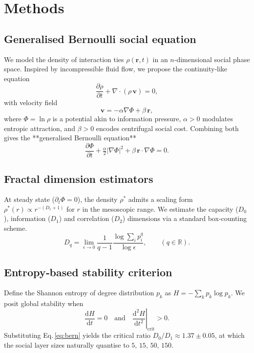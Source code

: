 \section{Methods}\label{sec:methods}

\subsection{Generalised Bernoulli social equation}\label{sec:bernoulli}
We model the density of interaction ties $\rho(\mathbf{r},t)$ in an $n$‑dimensional social phase space.  
Inspired by incompressible fluid flow, we propose the continuity‐like equation
\begin{equation}
\frac{\partial \rho}{\partial t} + \nabla\!\cdot\!(\rho\,\mathbf{v}) = 0 ,
\end{equation}
with velocity field
\begin{equation}
\mathbf{v} = -\alpha \nabla \Phi + \beta\,\mathbf{r},
\end{equation}
where $\Phi = \ln\rho$ is a potential akin to information pressure,  
$\alpha>0$ modulates entropic attraction, and $\beta>0$ encodes centrifugal social cost.  
Combining both gives the **generalised Bernoulli equation**
\begin{equation}
\frac{\partial \Phi}{\partial t} + \tfrac{\alpha}{2}\bigl|\nabla\Phi\bigr|^{2}
+ \beta\,\mathbf{r}\!\cdot\!\nabla\Phi = 0 .
\label{eq:bern}
\end{equation}

\subsection{Fractal dimension estimators}\label{sec:fractal}
At steady state ($\partial_t\Phi=0$), the density $\rho^\ast$ admits a scaling form  
$\rho^\ast(r) \propto r^{-(D_{1}+1)}$ for $r$ in the mesoscopic range.  
We estimate the capacity ($D_{0}$), information ($D_{1}$) and correlation ($D_{2}$)  
dimensions via a standard box‐counting scheme\cite{falconer2014fractal}.
\begin{equation}
D_{q} =
\lim_{\epsilon\to 0}\frac{1}{q-1}
\frac{\log\sum_{i} p_{i}^{q}}{\log \epsilon},
\qquad (q\in\mathbb{R}).
\end{equation}

\subsection{Entropy‑based stability criterion}\label{sec:entropy}
Define the Shannon entropy of degree distribution $p_{k}$ as
$H = -\sum_{k} p_{k}\log p_{k}$.
We posit global stability when
\begin{equation}
\frac{\mathrm{d}H}{\mathrm{d}t}=0
\quad\text{and}\quad
\left.\frac{\mathrm{d}^{2}H}{\mathrm{d}t^{2}}\right|_{\mathrm{crit}}>0 .
\end{equation}
Substituting Eq.\,\eqref{eq:bern} yields the critical ratio
$D_{0}/D_{1} \approx 1.37 \pm 0.05$,
at which the social layer sizes naturally quantise to
$5,\,15,\,50,\,150$.
